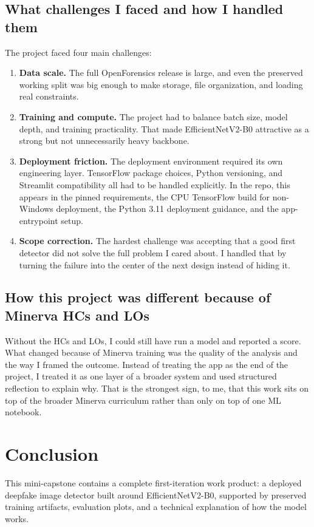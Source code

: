 \documentclass[11pt]{article}
\begin{document}
\subsection{What challenges I faced and how I handled them}
The project faced four main challenges:
\begin{enumerate}[leftmargin=1.5em]
    \item \textbf{Data scale.} The full OpenForensics release is large, and even the preserved working split was big enough to make storage, file organization, and loading real constraints.
    \item \textbf{Training and compute.} The project had to balance batch size, model depth, and training practicality. That made EfficientNetV2-B0 attractive as a strong but not unnecessarily heavy backbone.
    \item \textbf{Deployment friction.} The deployment environment required its own engineering layer. TensorFlow package choices, Python versioning, and Streamlit compatibility all had to be handled explicitly. In the repo, this appears in the pinned requirements, the CPU TensorFlow build for non-Windows deployment, the Python 3.11 deployment guidance, and the app-entrypoint setup.
    \item \textbf{Scope correction.} The hardest challenge was accepting that a good first detector did not solve the full problem I cared about. I handled that by turning the failure into the center of the next design instead of hiding it.
\end{enumerate}

\subsection{How this project was different because of Minerva HCs and LOs}
Without the HCs and LOs, I could still have run a model and reported a score. What changed because of Minerva training was the quality of the analysis and the way I framed the outcome. Instead of treating the app as the end of the project, I treated it as one layer of a broader system and used structured reflection to explain why. That is the strongest sign, to me, that this work sits on top of the broader Minerva curriculum rather than only on top of one ML notebook.

\section{Conclusion}
This mini-capstone contains a complete first-iteration work product: a deployed deepfake image detector built around EfficientNetV2-B0, supported by preserved training artifacts, evaluation plots, and a technical explanation of how the model works.
\end{document}
